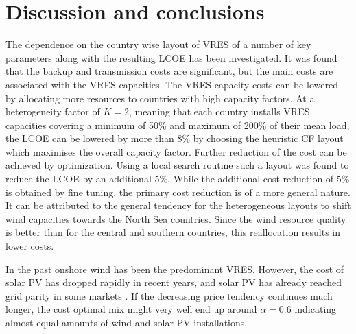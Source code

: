 \documentclass[a4paper, 5p, sort&compress]{elsarticle}%
\begin{document}
{%
\section{Discussion and conclusions}
\label{sec:four}

The dependence on the country wise layout of VRES of a number of key
parameters along with the resulting LCOE has been investigated. It was
found that the backup and transmission costs are significant, but the
main costs are associated with the VRES capacities. The VRES capacity
costs can be lowered by allocating more resources to countries with
high capacity factors. At a heterogeneity factor of $K = 2$, meaning
that each country installs VRES capacities covering a minimum of 50\%
and maximum of 200\% of their mean load, the LCOE can be lowered by
more than 8\% by choosing the heuristic CF layout which maximises the
overall capacity factor. Further reduction of the cost can be achieved
by optimization. Using a local search routine such a layout was found
to reduce the LCOE by an additional 5\%. While the additional cost
reduction of 5\% is obtained by fine tuning, the primary cost
reduction is of a more general nature. It can be attributed to the
general tendency for the heterogeneous layouts to shift wind
capacities towards the North Sea countries. Since the wind resource
quality is better than for the central and southern countries, this
reallocation results in lower costs.

In the past onshore wind has been the predominant VRES. However, the
cost of solar PV has dropped rapidly in recent years, and solar PV has
already reached grid parity in some markets \cite{solarGridParity}. If
the decreasing price tendency continues much longer, the cost optimal
mix might very well end up around $\alpha = 0.6$ indicating almost equal
amounts of wind and solar PV installations.



}
\end{document}
